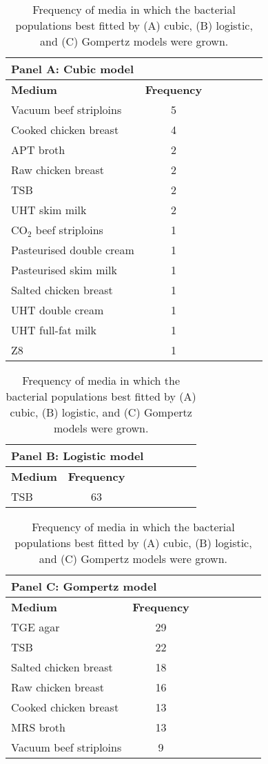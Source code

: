 \documentclass[11pt]{article}
\newcommand{\subsc}[1]{\ensuremath{_{\textrm{#1}}}}
\begin{document}
	
		\begin{table}[htbp]
		\caption{Frequency of media in which the bacterial populations best fitted by (A) cubic, (B) logistic, and (C) Gompertz models were grown.}
		\label{table3}
		\begin{tabularx}{\linewidth}{l*{6}{c}}
			\toprule
			\multicolumn{7}{l}{\textbf{Panel A: Cubic model}} \\
			\midrule
			\textbf{Medium} & \textbf{Frequency} \\
			Vacuum beef striploins & 5 \\
			Cooked chicken breast & 4 \\
			APT broth & 2 \\
			Raw chicken breast & 2 \\
			TSB & 2 \\
			UHT skim milk & 2 \\
			CO\subsc{2} beef striploins & 1 \\
			Pasteurised double cream & 1 \\
			Pasteurised skim milk & 1 \\
			Salted chicken breast & 1 \\
			UHT double cream & 1 \\
			UHT full-fat milk & 1 \\
			Z8 & 1 \\
			\bottomrule   
		\end{tabularx}
		\begin{tabularx}{\linewidth}{l*{7}{c}}
			\toprule
			\multicolumn{7}{l}{\textbf{Panel B: Logistic model}} \\
			\midrule
			\textbf{Medium} & \textbf{Frequency} \\
			TSB & 63 \\
			\bottomrule
		\end{tabularx}
		\begin{tabularx}{\linewidth}{l*{7}{c}}
			\toprule
			\multicolumn{7}{l}{\textbf{Panel C: Gompertz model}} \\
			\midrule
			\textbf{Medium} & \textbf{Frequency} \\
			TGE agar & 29 \\
			TSB & 22 \\
			Salted chicken breast & 18 \\
			Raw chicken breast & 16 \\
			Cooked chicken breast & 13 \\
			MRS broth & 13 \\
			Vacuum beef striploins & 9 \\

\end{tabularx}
\end{table}
\end{document}
